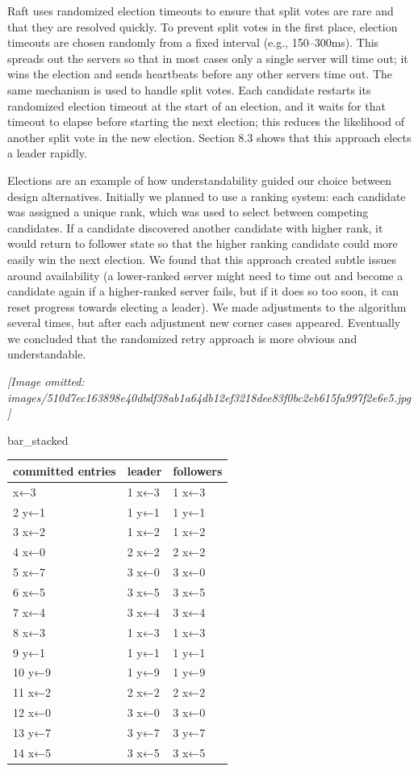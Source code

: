 \documentclass[
]{article}
\newcounter{none} %
\begin{document}
Raft uses randomized election timeouts to ensure that split votes are
rare and that they are resolved quickly. To prevent split votes in the
first place, election timeouts are chosen randomly from a fixed interval
(e.g., 150--300ms). This spreads out the servers so that in most cases
only a single server will time out; it wins the election and sends
heartbeats before any other servers time out. The same mechanism is used
to handle split votes. Each candidate restarts its randomized election
timeout at the start of an election, and it waits for that timeout to
elapse before starting the next election; this reduces the likelihood of
another split vote in the new election. Section 8.3 shows that this
approach elects a leader rapidly.

Elections are an example of how understandability guided our choice
between design alternatives. Initially we planned to use a ranking
system: each candidate was assigned a unique rank, which was used to
select between competing candidates. If a candidate discovered another
candidate with higher rank, it would return to follower state so that
the higher ranking candidate could more easily win the next election. We
found that this approach created subtle issues around availability (a
lower-ranked server might need to time out and become a candidate again
if a higher-ranked server fails, but if it does so too soon, it can
reset progress towards electing a leader). We made adjustments to the
algorithm several times, but after each adjustment new corner cases
appeared. Eventually we concluded that the randomized retry approach is
more obvious and understandable.

\textit{[Image omitted: images/510d7ec163898e40dbdf38ab1a64db12ef3218dee83f0bc2eb615fa997f2e6e5.jpg]}

bar\_stacked

{\def\LTcaptype{none} %
\begin{longtable}[]{@{}lll@{}}
\toprule\noalign{}
committed entries & leader & followers \\
\midrule\noalign{}
\endhead
\bottomrule\noalign{}
\endlastfoot
1 x←3 & 1 x←3 & 1 x←3 \\
2 y←1 & 1 y←1 & 1 y←1 \\
3 x←2 & 1 x←2 & 1 x←2 \\
4 x←0 & 2 x←2 & 2 x←2 \\
5 x←7 & 3 x←0 & 3 x←0 \\
6 x←5 & 3 x←5 & 3 x←5 \\
7 x←4 & 3 x←4 & 3 x←4 \\
8 x←3 & 1 x←3 & 1 x←3 \\
9 y←1 & 1 y←1 & 1 y←1 \\
10 y←9 & 1 y←9 & 1 y←9 \\
11 x←2 & 2 x←2 & 2 x←2 \\
12 x←0 & 3 x←0 & 3 x←0 \\
13 y←7 & 3 y←7 & 3 y←7 \\
14 x←5 & 3 x←5 & 3 x←5 \\
\end{longtable}
}
\end{document}
